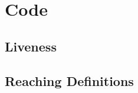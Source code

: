 \documentclass[12pt]{article}
\begin{document}
\newpage
\clearpage

\section{Code}

\subsection{Liveness}

{\tiny }

\subsection{Reaching Definitions}

{\tiny }
\end{document}
